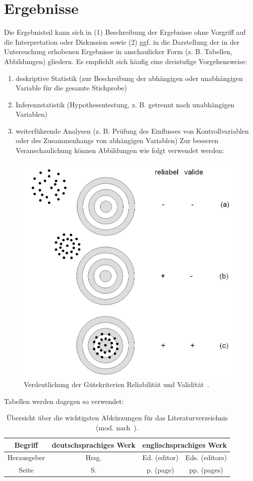\chapter{Ergebnisse}
Die Ergebnisteil kann sich in (1) Beschreibung der Ergebnisse ohne Vorgriff auf die Interpretation oder Diskussion sowie (2) ggf. in die Darstellung der in der Untersuchung erhobenen Ergebnisse in anschaulicher Form (z. B. Tabellen, Abbildungen) gliedern. Es empfiehlt sich häufig eine dreistufige Vorgehensweise:
\begin{enumerate}
	\item deskriptive Statistik (zur Beschreibung der abhängigen oder unabhängigen Variable für die gesamte Stichprobe)
	\item Inferenzstatistik (Hypothesentestung, z. B. getrennt nach unabhängigen Variablen)
	\item weiterführende Analysen (z. B. Prüfung des Einflusses von Kontrollvariablen oder des Zusammenhangs von abhängigen Variablen)
	Zur besseren Veranschaulichung können Abbildungen wie folgt verwendet werden:	
\end{enumerate}
\begin{figure}[h]
	\centering
	\includegraphics[width=0.7\linewidth]{images/guetekriterien-reliabilitaet-und-variabilitaet}
	\caption{Verdeutlichung der Gütekriterien Reliabilität und Validität~\parencite[23]{Boes2004}.}
	\label{fig:guetekriterien-reliabilitaet-und-variabilitaet}
\end{figure}
Tabellen werden dagegen so verwendet:
\begin{table}
	\centering
	\caption{Übersicht über die wichtigsten Abkürzungen für das Literaturverzeichnis (mod. nach~\cite[9]{DVS2013}).}
	\label{tab:uebersicht-wichtigste-abkuerzungen}
	\begin{tabular}{|c|c|c|c|}
		\hline
		Begriff & deutschsprachiges Werk & \multicolumn{2}{c|}{englischsprachiges Werk}\\
		\hline
		Herausgeber & Hrsg. & Ed. (editor) & Eds. (editors) \\
		\hline
		Seite & S. & p. (page) & pp. (pages) \\
		\hline
	\end{tabular}
\end{table}

